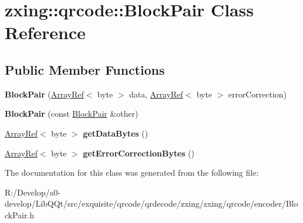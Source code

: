 \hypertarget{classzxing_1_1qrcode_1_1_block_pair}{}\section{zxing\+:\+:qrcode\+:\+:Block\+Pair Class Reference}
\label{classzxing_1_1qrcode_1_1_block_pair}
\subsection*{Public Member Functions}
\begin{DoxyCompactItemize}
\item 
\mbox{\label{classzxing_1_1qrcode_1_1_block_pair_aa43f0df9dce3aec403565768172be036}} 
{\bfseries Block\+Pair} (\mbox{\hyperlink{classzxing_1_1_array_ref}{Array\+Ref}}$<$ byte $>$ data, \mbox{\hyperlink{classzxing_1_1_array_ref}{Array\+Ref}}$<$ byte $>$ error\+Correction)
\item 
\mbox{\label{classzxing_1_1qrcode_1_1_block_pair_a5edfea26fa24fd2996329b4e4642612d}} 
{\bfseries Block\+Pair} (const \mbox{\hyperlink{classzxing_1_1qrcode_1_1_block_pair}{Block\+Pair}} \&other)
\item 
\mbox{\label{classzxing_1_1qrcode_1_1_block_pair_a233aef4ba6d6f92900eb38e095733307}} 
\mbox{\hyperlink{classzxing_1_1_array_ref}{Array\+Ref}}$<$ byte $>$ {\bfseries get\+Data\+Bytes} ()
\item 
\mbox{\label{classzxing_1_1qrcode_1_1_block_pair_a599f3080ff6ffa1edd1c265581b7ac22}} 
\mbox{\hyperlink{classzxing_1_1_array_ref}{Array\+Ref}}$<$ byte $>$ {\bfseries get\+Error\+Correction\+Bytes} ()
\end{DoxyCompactItemize}


The documentation for this class was generated from the following file\+:\begin{DoxyCompactItemize}
\item 
R\+:/\+Develop/a0-\/develop/\+Lib\+Q\+Qt/src/exquisite/qrcode/qrdecode/zxing/zxing/qrcode/encoder/Block\+Pair.\+h\end{DoxyCompactItemize}
